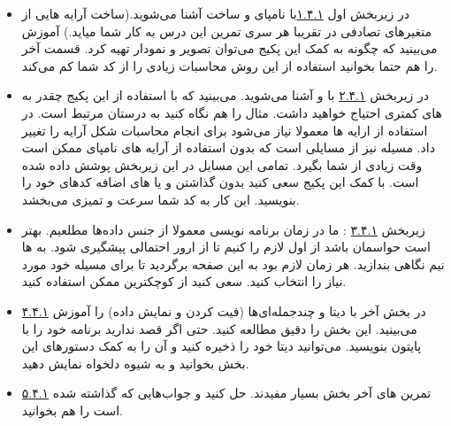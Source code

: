 \documentclass[11pt, a4paper]{article}
\begin{document}
\begin{itemize}[label=\Large $\bullet$]
	\item 
	در زیربخش اول \href{https://scipy-lectures.org/intro/numpy/array_object.html}{ ۱.۴.۱}با نامپای و ساخت  آشنا می‌شوید.(ساخت آرایه هایی از متغیرهای تصادفی در تقریبا هر سری تمرین این درس به کار شما میاید.) آموزش می‌بینید که چگونه به کمک این پکیج می‌توان تصویر و نمودار تهیه کرد. قسمت آخر  را هم حتما بخوانید استفاده از این روش محاسبات زیادی را از کد شما کم می‌کند.
	
	\item
	در زیربخش \href{https://scipy-lectures.org/intro/numpy/operations.html}{ ۲.۴.۱}
با  و  آشنا می‌شوید. می‌بینید که با استفاده از این پکیج چقدر به  های کمتری احتیاج خواهید داشت. 
مثال  را هم نگاه کنید به درستان مرتبط است. 
در استفاده از ارایه ها معمولا نیاز می‌شود برای انجام محاسبات شکل آرایه را تغییر داد. 
مسیله  نیز از مسایلی است که بدون استفاده از آرایه های نامپای ممکن است وقت زیادی از شما بگیرد. تمامی این مسایل در این زیربخش پوشش داده شده است.
 با کمک این پکیج سعی کنید بدون گذاشتن  و یا  های اضافه کدهای خود را بنویسید. این کار به کد شما سرعت و تمیزی می‌بخشد.

\item
  زیربخش \href{https://scipy-lectures.org/intro/numpy/elaborate_arrays.html}{ ۳.۴.۱}
: ما در زمان برنامه نویسی معمولا از جنس داده‌ها مطلعیم. بهتر است حواسمان باشد از اول  لازم را  کنیم تا از ارور احتمالی پیشگیری شود. به  ها نیم نگاهی بندازید. هر زمان لازم بود به این صفحه برگردید تا برای مسیله خود  مورد نیاز را انتخاب کنید. سعی کنید از کوچکترین  ممکن استفاده کنید.

\item 
\href{https://scipy-lectures.org/intro/numpy/advanced_operations.html}{۴.۴.۱}
در بخش آخر با دیتا و چندجمله‌ای‌ها (فیت کردن و نمایش داده) را آموزش می‌بینید. این بخش را دقیق مطالعه کنید. حتی اگر قصد ندارید برنامه خود را با پایتون بنویسید. می‌توانید دیتا خود را ذخیره کنید و آن را به کمک دستورهای این بخش بخوانید و به شیوه دلخواه نمایش دهید.

\item
\href{https://scipy-lectures.org/intro/numpy/exercises.html}{۵.۴.۱}
تمرین های آخر بخش بسیار مفیدند.  حل کنید و جواب‌هایی که گذاشته شده است را هم بخوانید.

\end{itemize}
\end{document}
